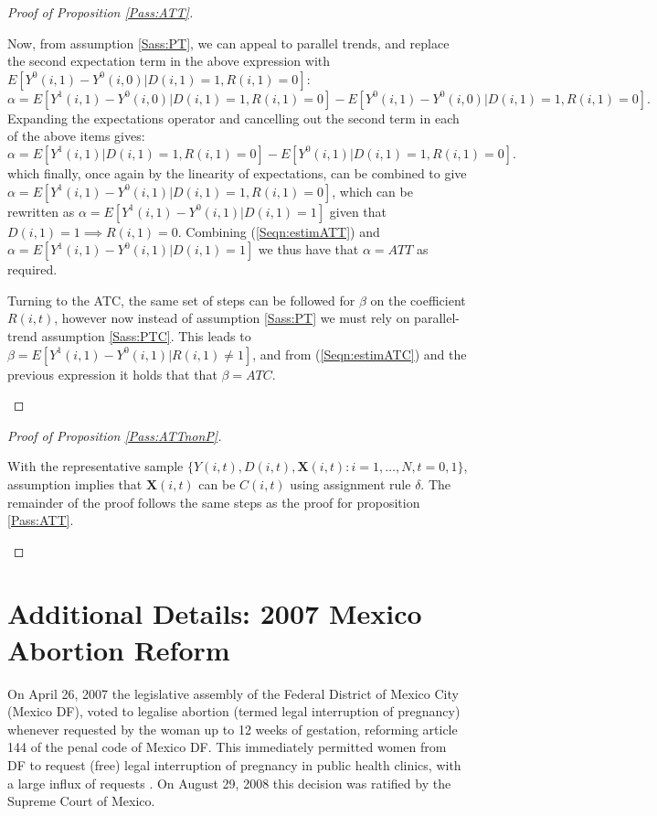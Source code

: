 \begin{proof}[Proof of Proposition \ref{Pass:ATT}]
\begin{footnotesize}
Now, from assumption \ref{Sass:PT}, we can appeal to parallel trends, and 
replace the second expectation term in the above expression with $E
[Y^0(i,1)-Y^0(i,0)|D(i,1)=1,R(i,1)=0]$:
\begin{equation}
\nonumber
\label{Seqn:alphaProof4}
\alpha=E[Y^1(i,1)-Y^0(i,0)|D(i,1)=1,R(i,1)=0] - E[Y^0(i,1)-Y^0(i,0)|D(i,1)=1,R(i,1)=0].
\end{equation}
Expanding the expectations operator and cancelling out the second term in each of
the above items gives:
\begin{equation}
\nonumber
\label{Seqn:alphaProof5}
\alpha=E[Y^1(i,1)|D(i,1)=1,R(i,1)=0] - E[Y^0(i,1)|D(i,1)=1,R(i,1)=0].
\end{equation}
which finally, once again by the linearity of expectations, can be combined to 
give $\alpha=E[Y^1(i,1)-Y^0(i,1)|D(i,1)=1,R(i,1)=0]$, which can be 
rewritten as $\alpha=E[Y^1(i,1)-Y^0(i,1)|D(i,1)=1]$ given that 
$D(i,1)=1 \implies R(i,1)=0$.  Combining (\ref{Seqn:estimATT}) and $\alpha=
E[Y^1(i,1)-Y^0(i,1)|D(i,1)=1]$ we thus have that $\alpha=ATT$ as 
required.

Turning to the ATC, the same set of steps can be followed for $\beta$ on the 
coefficient $R(i,t)$, however now instead of assumption \ref{Sass:PT} we must
rely on parallel-trend assumption \ref{Sass:PTC}. This leads to $\beta=
E[Y^1(i,1)-Y^0(i,1)|R(i,1)\neq 1]$, and from (\ref{Seqn:estimATC}) 
and the previous expression it holds that that $\beta=ATC$.
\end{footnotesize}
\end{proof}

\begin{proof}[Proof of Proposition \ref{Pass:ATTnonP}]
\begin{footnotesize}
With the representative sample $\{Y(i,t), D(i,t), \mathbf{X}(i,t): i=1, \ldots, N, 
t=0, 1\}$, assumption  implies that $\mathbf{X}(i,t)$ can
be $C(i,t)$ using assignment rule $\delta$.  The remainder of the proof follows
the same steps as the proof for proposition \ref{Pass:ATT}.
\end{footnotesize}
\end{proof}

\clearpage
\section{Additional Details: 2007 Mexico Abortion Reform}
\label{Sscn:MAbort}
On April 26, 2007 the legislative assembly of the Federal District of Mexico
City (Mexico DF), voted to legalise abortion (termed legal interruption of
pregnancy) whenever requested by the woman up to 12 weeks of gestation,
reforming article 144 of the penal code of Mexico DF. This immediately 
permitted women from DF to request (free) legal interruption of pregnancy in 
public health clinics, with a large influx of requests 
\citep{Contrerasetal2011}. On August 29, 2008 this decision was ratified by the 
Supreme Court of Mexico.

